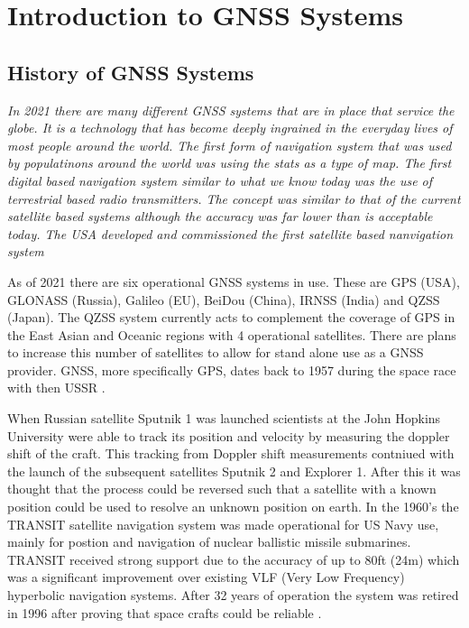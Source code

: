 
\chapter{Introduction to GNSS Systems} %

\label{Chapter2} %


\section{History of GNSS Systems}
\emph{In 2021 there are many different GNSS systems that are in place that service the globe. It is a technology that has become deeply ingrained in the everyday lives of
most people around the world. The first form of navigation system that was used by populatinons around the world was using the stats as a type of map. The first digital
based navigation system similar to what we know today was the use of terrestrial based radio transmitters. The concept was similar to that of the current satellite based
systems although the accuracy was far lower than is acceptable today. The USA developed and commissioned the first satellite based nanvigation system}

As of 2021 there are six operational GNSS systems in use. These are GPS (USA), GLONASS (Russia), Galileo (EU), BeiDou (China), IRNSS (India) and QZSS (Japan). The QZSS
system currently acts to complement the coverage of GPS in the East Asian and Oceanic regions with 4 operational satellites. There are plans to increase this number of
satellites to allow for stand alone use as a GNSS provider. 
GNSS, more specifically GPS, dates back to 1957 during the space race with then USSR \cite{RN43}. 

When Russian satellite Sputnik 1 was launched scientists at the John Hopkins University were able to
track its position and velocity by measuring the doppler shift of the craft. This tracking from Doppler shift measurements contniued with the launch of the subsequent
satellites Sputnik 2 and Explorer 1. After this it was thought that the process could be reversed such that a satellite with a known position could be used to resolve an
unknown position on earth. In the 1960's the TRANSIT satellite navigation system was made operational for US Navy use, mainly for postion and navigation of nuclear
ballistic missile submarines. TRANSIT received strong support due to the accuracy of up to 80ft (24m) which was a significant improvement over existing VLF (Very Low
Frequency) hyperbolic navigation systems. After 32 years of operation the system was retired in 1996 after proving that space crafts could be reliable \cite{RN45}. 

